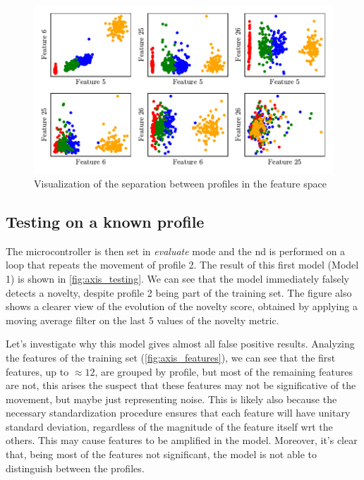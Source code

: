 \begin{figure}
    \centering
    \includegraphics{images/LinearMotor/Scatter.pdf}
    \caption{Visualization of the separation between profiles in the feature space}
    \label{fig:axis_scatter}
\end{figure}


\subsection{Testing on a known profile}
The microcontroller is then set in \emph{evaluate} mode and the \gls{nd} is performed on a loop that repeats the movement of profile 2. The result of this first model (Model 1) is shown in \autoref{fig:axis_testing}. We can see that the model immediately falsely detects a novelty, despite profile 2 being part of the training set. The figure also shows a clearer view of the evolution of the novelty score, obtained by applying a moving average filter on the last 5 values of the novelty metric.

Let's investigate why this model gives almost all false positive results. Analyzing the features of the training set (\autoref{fig:axis_features}), we can see that the first features, up to $\approx 12$, are grouped by profile, but most of the remaining features are not, this arises the suspect that these features may not be significative of the movement, but maybe just representing noise. This is likely also because the necessary standardization procedure ensures that each feature will have unitary standard deviation, regardless of the magnitude of the feature itself \gls{wrt} the others. This may cause  features to be amplified in the model. Moreover, it's clear that, being most of the features not significant, the model is not able to distinguish between the profiles.

